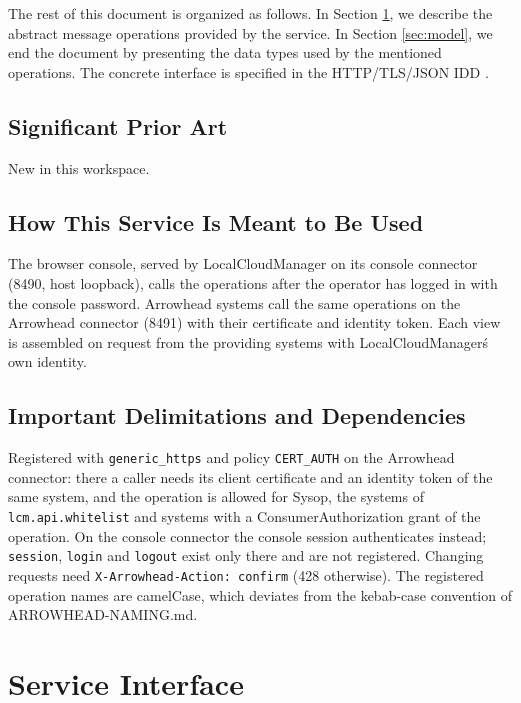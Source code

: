 \documentclass[a4paper]{arrowhead}
\begin{document}
The rest of this document is organized as follows.
In Section \ref{sec:operations}, we describe the abstract message operations provided by the service.
In Section \ref{sec:model}, we end the document by presenting the data types used by the mentioned operations.
The concrete interface is specified in the HTTP/TLS/JSON IDD \cite{lcm-localCloudManagement-http-idd}.

\subsection{Significant Prior Art}

New in this workspace.

\subsection{How This Service Is Meant to Be Used}

The browser console, served by LocalCloudManager on its console connector (8490, host loopback), calls the operations after the operator has logged in with the console password. Arrowhead systems call the same operations on the Arrowhead connector (8491) with their certificate and identity token. Each view is assembled on request from the providing systems with LocalCloudManager\'s own identity.

\subsection{Important Delimitations and Dependencies}
\label{sec:delimitations}

Registered with \texttt{generic\_\allowbreak{}https} and policy \texttt{CERT\_\allowbreak{}AUTH} on the Arrowhead connector: there a caller needs its client certificate and an identity token of the same system, and the operation is allowed for Sysop, the systems of \texttt{lcm.\allowbreak{}api.\allowbreak{}whitelist} and systems with a ConsumerAuthorization grant of the operation. On the console connector the console session authenticates instead; \texttt{session}, \texttt{login} and \texttt{logout} exist only there and are not registered. Changing requests need \texttt{X-\allowbreak{}Arrowhead-\allowbreak{}Action:\allowbreak{} confirm} (428 otherwise). The registered operation names are camelCase, which deviates from the kebab-case convention of ARROWHEAD-NAMING.md.

\newpage

\section{Service Interface}
\label{sec:operations}
\end{document}
